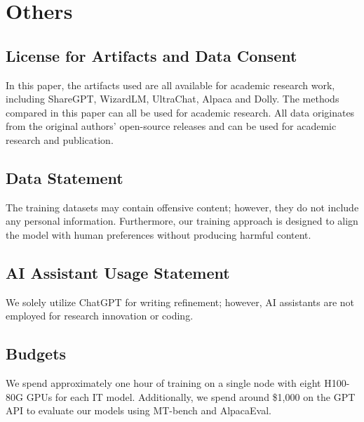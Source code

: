 \section{Others}
\subsection{License for Artifacts and Data Consent}
In this paper, the artifacts used are all available for academic research work, including ShareGPT, WizardLM, UltraChat, Alpaca and Dolly.
The methods compared in this paper can all be used for academic research.
All data originates from the original authors' open-source releases and can be used for academic research and publication.

\subsection{Data Statement}

The training datasets may contain offensive content; however, they do not include any personal information.
Furthermore, our training approach is designed to align the model with human preferences without producing harmful content.

\subsection{AI Assistant Usage Statement}

We solely utilize ChatGPT for writing refinement; however, AI assistants are not employed for research innovation or coding.

\subsection{Budgets}
\label{ap:budgets}
We spend approximately one hour of training on a single node with eight H100-80G GPUs for each IT model. Additionally, we spend around \$1,000 on the GPT API to evaluate our models using MT-bench and AlpacaEval.

